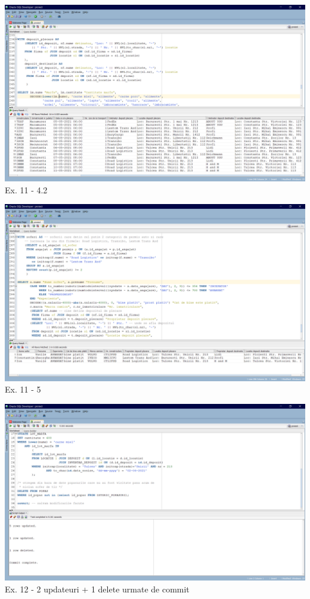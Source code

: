 \documentclass[12pt, a4paper]{article}
\begin{document}
\includegraphics[width=\textwidth]{ex11_4_2.PNG}
\label{Ex11 4.2}
\centering Ex. 11 - 4.2

\includegraphics[width=\textwidth]{ex11_5.PNG}
\label{Ex11 5}
\centering Ex. 11 - 5

\includegraphics[width=\textwidth]{ex12.PNG}
\label{Ex12}
\centering Ex. 12 - 2 updateuri + 1 delete urmate de commit
\end{document}
